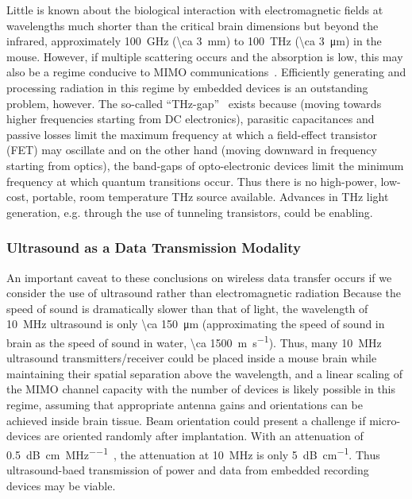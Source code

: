 Little is known about the biological interaction with electromagnetic fields at wavelengths much shorter than the critical brain dimensions but beyond the infrared, approximately \SI{100}{\giga\hertz} (\SI{\ca 3}{\milli\meter}) to \SI{100}{\tera\hertz} (\SI{\ca 3}{\micro\meter}) in the mouse.
However, if multiple scattering occurs and the absorption is low, this may also be a regime conducive to MIMO communications~\cite{bakopoulos09,helmchen05}.
Efficiently generating and processing radiation in this regime by embedded devices is an outstanding problem, however.
The so-called ``THz-gap''~\cite{tonouchi07} exists because (moving towards higher frequencies starting from DC electronics), parasitic capacitances and passive losses limit the maximum frequency at which a field-effect transistor (FET) may oscillate and on the other hand (moving downward in frequency starting from optics), the band-gaps of opto-electronic devices limit the minimum frequency at which quantum transitions occur.
Thus there is no high-power, low-cost, portable, room temperature \si{THz} source available.
Advances in \si{THz} light generation, e.g. through the use of tunneling transistors, could be enabling.

\subsubsection{Ultrasound as a Data Transmission Modality}
An important caveat to these conclusions on wireless data transfer occurs if we consider the use of ultrasound rather than electromagnetic radiation
Because the speed of sound is dramatically slower than that of light, the wavelength of \SI{10}{\mega\hertz} ultrasound is only \SI{\ca 150}{\micro\meter} (approximating the speed of sound in brain as the speed of sound in water, \SI{\ca 1500}{\meter\per\second}).
Thus, many \SI{10}{\mega\hertz} ultrasound transmitters/receiver could be placed inside a mouse brain while maintaining their spatial separation above the wavelength, and a linear scaling of the MIMO channel capacity with the number of devices is likely possible in this regime, assuming that appropriate antenna gains and orientations can be achieved inside brain tissue. Beam orientation could present a challenge if micro-devices are oriented randomly after implantation.
With an attenuation of \SI{0.5}{\dB\per\centi\meter\per\mega\hertz}~\cite{hoskins10}, the attenuation at \SI{10}{\mega\hertz} is only \SI{5}{\dB\per\centi\meter}.
Thus ultrasound-baed transmission of power and data from embedded recording devices may be viable.

